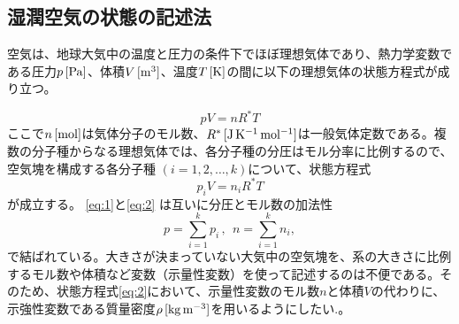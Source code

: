 \documentclass{ltjsarticle}
\begin{document}
\subsection{湿潤空気の状態の記述法}
空気は、地球大気中の温度と圧力の条件下でほぼ理想気体であり、熱力学変数である圧力$p\,[\rm{Pa}]$、体積$V\,[\rm{m^{3}}]$、温度$T\,[\rm{K}]$の間に以下の理想気体の状態方程式が成り立つ。

\begin{equation}\label{eq:1}
 pV=nR^{*}T 
\end{equation}
ここで$n\,[\rm{mol}]$は気体分子のモル数、$R^{*}\,[\rm{J\,K^{-1}\,mol^{-1}}]$は一般気体定数である。複数の分子種からなる理想気体では、各分子種の分圧はモル分率に比例するので、空気塊を構成する各分子種 $(i = 1,2,\dots, k)$について、状態方程式
\begin{equation}\label{eq:2}
 p_{i}V=n_{i}R^{*}T 
\end{equation}
が成立する。 \eqref{eq:1}と\eqref{eq:2} は互いに分圧とモル数の加法性
\begin{equation}\label{eq:3}
 p=\sum_{i=1}^{k}p_{i}\,, \ \ n=\sum_{i=1}^{k}n_{i},
\end{equation}
で結ばれている。大きさが決まっていない大気中の空気塊を、系の大きさに比例するモル数や体積など変数（示量性変数）を使って記述するのは不便である。そのため、状態方程式\eqref{eq:2}において、示量性変数のモル数$n$と体積$V$の代わりに、示強性変数である質量密度$\rho\,[\rm{kg\,m^{-3}}]$を用いるようにしたい.。
\end{document}
